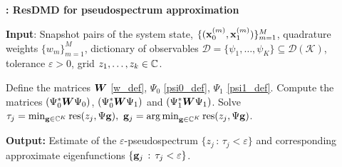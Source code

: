\begin{algorithm}
\caption{\textbf{: ResDMD for pseudospectrum approximation}}
\label{alg_pseudospectrum}
\textbf{Input}: Snapshot pairs of the system state, $\{(\vb{x}_0^{(m)}, \vb{x}_1^{(m)})\}_{m = 1}^M$, quadrature weights $\{w_m\}_{m = 1}^M$, dictionary of observables $\mathcal{D} = \{\psi_1, \dots, \psi_K\} \subseteq \mathcal{D}(\mathcal{K})$, tolerance $\varepsilon > 0$, grid $z_1, \dots, z_k \in\mathbb{C}$.
\begin{algorithmic}[1]
\State Define the matrices $\vb*{W}$ \eqref{w_def}, $\Psi_0$ \eqref{psi0_def}, $\Psi_1$ \eqref{psi1_def}. 
\State Compute the matrices $(\Psi_0^*\vb*{W}\Psi_0)$, $(\Psi_0^*\vb*{W}\Psi_1)$ and $(\Psi_1^*\vb*{W}\Psi_1)$.
\State Solve $\tau_j = \min_{\vb{g}\in\mathbb{C}^K} \mathrm{res}(z_j, \Psi\vb{g}),\,\, \vb{g}_j = \operatorname*{arg\,min}_{\vb{g}\in\mathbb{C}^K} \mathrm{res}(z_j, \Psi\vb{g})$.
\EndFor
\end{algorithmic}
\textbf{Output:} Estimate of the $\varepsilon$-pseudospectrum $\{z_j\,:\,\tau_j < \varepsilon\}$ and corresponding approximate eigenfunctions $\{\vb{g}_j\,:\,\tau_j < \varepsilon\}$. 
\end{algorithm}

